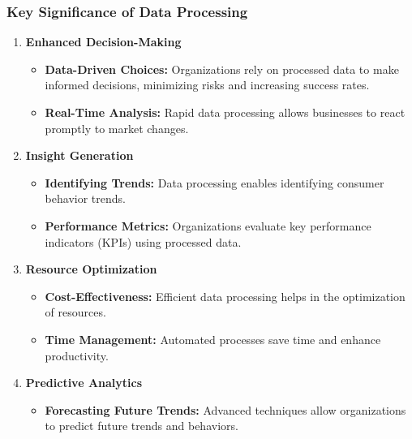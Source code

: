 \documentclass[aspectratio=169]{beamer}
\begin{document}
\begin{frame}[fragile]
    \frametitle{Key Significance of Data Processing}
    \begin{enumerate}
        \item \textbf{Enhanced Decision-Making}
            \begin{itemize}
                \item \textbf{Data-Driven Choices:} Organizations rely on processed data to make informed decisions, minimizing risks and increasing success rates.
                \item \textbf{Real-Time Analysis:} Rapid data processing allows businesses to react promptly to market changes.
            \end{itemize}
        \item \textbf{Insight Generation}
            \begin{itemize}
                \item \textbf{Identifying Trends:} Data processing enables identifying consumer behavior trends.
                \item \textbf{Performance Metrics:} Organizations evaluate key performance indicators (KPIs) using processed data.
            \end{itemize}
        \item \textbf{Resource Optimization}
            \begin{itemize}
                \item \textbf{Cost-Effectiveness:} Efficient data processing helps in the optimization of resources.
                \item \textbf{Time Management:} Automated processes save time and enhance productivity.
            \end{itemize}
        \item \textbf{Predictive Analytics}
            \begin{itemize}
                \item \textbf{Forecasting Future Trends:} Advanced techniques allow organizations to predict future trends and behaviors.
            \end{itemize}
    \end{enumerate}
\end{frame}
\end{document}
